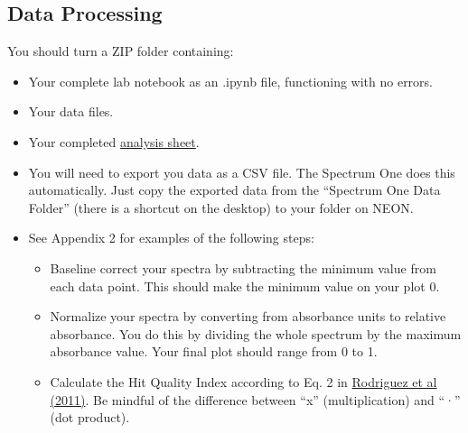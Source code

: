 \documentclass[]{tufte-book}
\providecommand{\tightlist}{%
  \setlength{\itemsep}{0pt}\setlength{\parskip}{0pt}}
\begin{document}
\hypertarget{data-processing-3}{%
\subsection{Data Processing}\label{data-processing-3}}

\begin{marginfigure}
You should turn a ZIP folder containing:

\begin{itemize}
\tightlist
\item
  Your complete lab notebook as an .ipynb file, functioning with no
  errors.\\
\item
  Your data files.\\
\item
  Your completed
  \href{https://github.com/alphonse/alphonse.github.io/raw/master/chem370/assignments/excel-templates/rotation_ftir_data-analysis.xlsx}{analysis
  sheet}.
\end{itemize}
\end{marginfigure}

\begin{itemize}
\tightlist
\item
  You will need to export you data as a CSV file. The Spectrum One does this automatically. Just copy the exported data from the ``Spectrum One Data Folder'' (there is a shortcut on the desktop) to your folder on NEON.
\item
  See Appendix 2 for examples of the following steps:

  \begin{itemize}
  \tightlist
  \item
    Baseline correct your spectra by subtracting the minimum value from each data point. This should make the minimum value on your plot 0.
  \item
    Normalize your spectra by converting from absorbance units to relative absorbance. You do this by dividing the whole spectrum by the maximum absorbance value. Your final plot should range from 0 to 1.\\
  \item
    Calculate the Hit Quality Index according to Eq. 2 in \href{https://www.researchgate.net/publication/51602215_Standardization_of_Raman_spectra_for_transfer_of_spectral_libraries_across_different_instruments}{Rodriguez et al (2011)}. Be mindful of the difference between ``x'' (multiplication) and ``·'' (dot product).
  \end{itemize}
\end{itemize}
\end{document}
